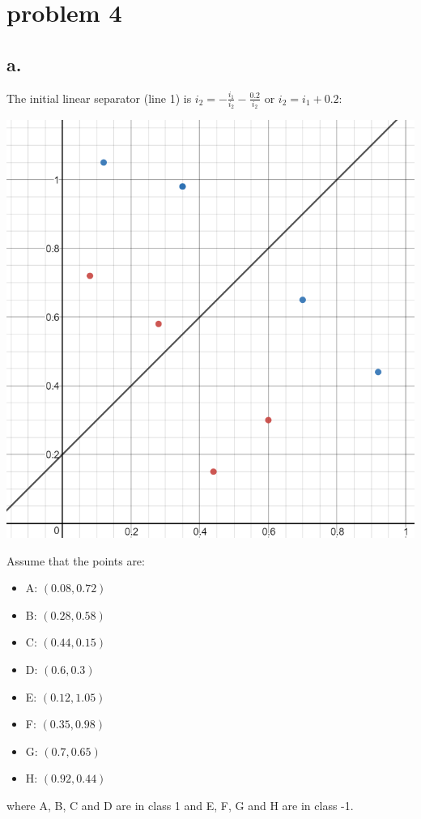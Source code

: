 \documentclass[12pt, letterpaper]{article}
\begin{document}
	
	\pagebreak
	\section{problem 4}
	\subsection{a.}
	The initial linear separator (line 1) is $i_2 = -\frac{i_1}{i_2} - \frac{0.2}{i_2}$ or $i_2 = i_1 + 0.2$:
	\medskip
	
	\includegraphics[scale=0.6]{"Problem 4/Initial Linear Separator"}
	
	\medskip 
	\noindent Assume that the points are:
	\begin{itemize}
		\item A: $(0.08, 0.72)$
		\item B: $(0.28, 0.58)$
		\item C: $(0.44, 0.15)$
		\item D: $(0.6, 0.3)$
		\item E: $(0.12, 1.05)$
		\item F: $(0.35, 0.98)$
		\item G: $(0.7, 0.65)$
		\item H: $(0.92, 0.44)$	
	\end{itemize}
	where A, B, C and D are in class 1 and E, F, G and H are in class -1. 	 
	
\end{document}
